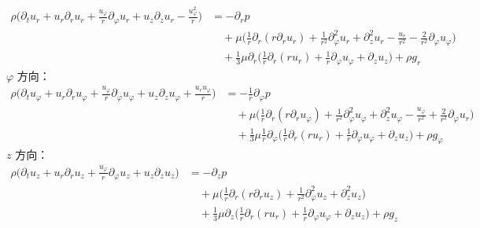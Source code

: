 $$
\begin{aligned}
\rho \big(
\partial_t u_r
+ u_r \partial_r u_r
+ \frac{u_\varphi}{r} \partial_\varphi u_r
+ u_z \partial_z u_r
- \frac{u_\varphi^2}{r}
\big)
&= -\partial_r p \\
&\quad + \mu \Big(
\frac{1}{r}\partial_r(r \partial_r u_r)
+ \frac{1}{r^2}\partial_\varphi^2 u_r
+ \partial_z^2 u_r
- \frac{u_r}{r^2}
- \frac{2}{r^2}\partial_\varphi u_\varphi
\Big) \\
&\quad + \frac{1}{3}\mu \partial_r
\Big(
\frac{1}{r}\partial_r(r u_r)
+ \frac{1}{r}\partial_\varphi u_\varphi
+ \partial_z u_z
\Big)
+ \rho g_r
\end{aligned}~
$$
$\varphi$ 方向：
$$
\begin{aligned}
\rho \big(
\partial_t u_\varphi
+ u_r \partial_r u_\varphi
+ \frac{u_\varphi}{r} \partial_\varphi u_\varphi
+ u_z \partial_z u_\varphi
+ \frac{u_r u_\varphi}{r}
\big)
&= -\frac{1}{r} \partial_\varphi p \\
&\quad + \mu \Big(
\frac{1}{r} \partial_r(r \partial_r u_\varphi)
+ \frac{1}{r^2} \partial_\varphi^2 u_\varphi
+ \partial_z^2 u_\varphi
- \frac{u_\varphi}{r^2}
+ \frac{2}{r^2} \partial_\varphi u_r
\Big) \\
&\quad + \frac{1}{3}\mu \frac{1}{r} \partial_\varphi
\Big(
\frac{1}{r}\partial_r(r u_r)
+ \frac{1}{r}\partial_\varphi u_\varphi
+ \partial_z u_z
\Big)
+ \rho g_\varphi
\end{aligned}~
$$
$z$ 方向：
$$
\begin{aligned}
\rho \big(
\partial_t u_z
+ u_r \partial_r u_z
+ \frac{u_\varphi}{r} \partial_\varphi u_z
+ u_z \partial_z u_z
\big)
&= -\partial_z p \\
&\quad + \mu \Big(
\frac{1}{r} \partial_r(r \partial_r u_z)
+ \frac{1}{r^2} \partial_\varphi^2 u_z
+ \partial_z^2 u_z
\Big) \\
&\quad + \frac{1}{3}\mu \partial_z
\Big(
\frac{1}{r}\partial_r(r u_r)
+ \frac{1}{r}\partial_\varphi u_\varphi
+ \partial_z u_z
\Big)
+ \rho g_z
\end{aligned}~
$$
